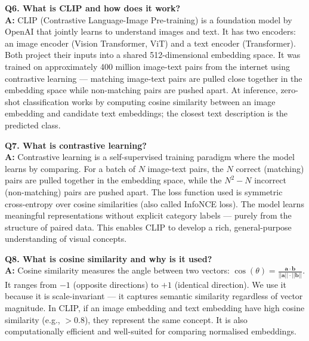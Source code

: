 \documentclass[12pt, a4paper]{article}
\begin{document}
\begin{qa}
\textbf{Q6. What is CLIP and how does it work?}\\[4pt]
\textbf{A:} CLIP (Contrastive Language-Image Pre-training) is a foundation model by OpenAI that jointly learns to understand images and text. It has two encoders: an image encoder (Vision Transformer, ViT) and a text encoder (Transformer). Both project their inputs into a shared 512-dimensional embedding space. It was trained on approximately 400 million image-text pairs from the internet using contrastive learning --- matching image-text pairs are pulled close together in the embedding space while non-matching pairs are pushed apart. At inference, zero-shot classification works by computing cosine similarity between an image embedding and candidate text embeddings; the closest text description is the predicted class.
\end{qa}

\begin{qa}
\textbf{Q7. What is contrastive learning?}\\[4pt]
\textbf{A:} Contrastive learning is a self-supervised training paradigm where the model learns by comparing. For a batch of $N$ image-text pairs, the $N$ correct (matching) pairs are pulled together in the embedding space, while the $N^2 - N$ incorrect (non-matching) pairs are pushed apart. The loss function used is symmetric cross-entropy over cosine similarities (also called InfoNCE loss). The model learns meaningful representations without explicit category labels --- purely from the structure of paired data. This enables CLIP to develop a rich, general-purpose understanding of visual concepts.
\end{qa}

\begin{qa}
\textbf{Q8. What is cosine similarity and why is it used?}\\[4pt]
\textbf{A:} Cosine similarity measures the angle between two vectors: $\cos(\theta) = \frac{\mathbf{a} \cdot \mathbf{b}}{||\mathbf{a}|| \cdot ||\mathbf{b}||}$. It ranges from $-1$ (opposite directions) to $+1$ (identical direction). We use it because it is scale-invariant --- it captures semantic similarity regardless of vector magnitude. In CLIP, if an image embedding and text embedding have high cosine similarity (e.g., $>0.8$), they represent the same concept. It is also computationally efficient and well-suited for comparing normalised embeddings.
\end{qa}
\end{document}

